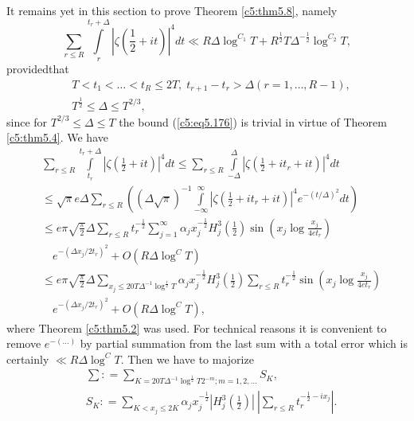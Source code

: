 It remains yet in this section to prove Theorem \ref{c5:thm5.8},
namely 
\begin{equation}
\sum\limits_{r \leq R} \int\limits^{t_r + \Delta}_{r} |\zeta
\left(\frac{1}{2} + it \right)|^4 dt \ll R\Delta \log^{C_1} T +
R^{\frac{1}{2}} T \Delta^{-\frac{1}{2}} \log^{C_2} T, 
\label{c5:eq5.176}
\end{equation}
provided\pageoriginale that
\begin{align*}
& T < t_1 < \ldots < t_R \leq 2 T, \; t_{r+1} - t_r > \Delta
(r=1,\ldots, R -1),\\ 
& T^{\frac{1}{2}} \leq \Delta \leq T^{2/3}, 
\end{align*}
since for $T^{2/3} \leq \Delta \leq T$ the bound (\ref{c5:eq5.176}) is
trivial in virtue of Theorem \ref{c5:thm5.4}. We have  
\begin{align*} 
&\sum\limits_{r \leq R} \int\limits^{t_r+\Delta}_{t_r} \left|\zeta
\left(\frac{1}{2} + it \right)\right|^4 dt \leq \sum\limits_{r \leq R}
\int\limits^{\Delta}_{-\Delta} \left|\zeta \left(\frac{1}{2} + it_r +
it \right)\right|^4 dt\\ 
&\leq \sqrt{\pi} e \Delta \sum\limits_{r \leq R} \left((\Delta
\sqrt{\pi})^{-1} \int\limits^{\infty}_{-\infty}  \left|\zeta
\left(\frac{1}{2} + it_r + it \right)\right|^4 e^{-(t/\Delta)^2} dt
\right)\\ 
&\leq e \pi \sqrt{\frac{\pi}{2}} \Delta \sum\limits_{r \leq R}
t^{-\frac{1}{2}}_r \sum\limits^\infty_{j=1} \alpha_j
x^{-\frac{1}{2}}_j H^3_j \left(\frac{1}{2} \right)  \sin \left(x_j
\log \frac{x_j}{4 et_r} \right)\\
&\quad e^{-(\Delta x_j/ 2t_r)^2} + O (R \Delta \log^C T)\\ 
&\leq e\pi \sqrt{\frac{\pi}{2}} \Delta \sum\limits_{x_j \leq 20 T
  \Delta^{-1} \log^{\frac{1}{2}} T} \alpha_j x^{-\frac{1}{2}}_j H^3_j
\left(\frac{1}{2} \right) \sum\limits_{r \leq R} t^{-\frac{1}{2}}_r
\sin \left(x_j \log \frac{x_j}{4 et_r} \right)\\  
&\quad e^{-(\Delta x_j/2 t_r)^2} + O (R \Delta \log^C T), 
\end{align*}
where Theorem \ref{c5:thm5.2} was used. For technical reasons it is
convenient to remove $e^{-(\ldots)}$ by partial summation from the
last sum with a total error which is certainly $\ll R \Delta \log^C
T$. Then we have to majorize  
\begin{align*}
& \sum:  = \sum\limits_{K = 20 T \Delta^{-1} \log^{\frac{1}{2}} T
    2^{-m}; m = 1,2, \ldots } S_K,\\ 
& S_K : = \sum\limits_{K < x_j \leq 2 K} \alpha_j x_j^{-\frac{1}{2}}
  \left|H^3_j \left(\frac{1}{2} \right)\right|~ \left| \sum\limits_{r \leq R}
  t^{-\frac{1}{2} - i x_j}_r\right|. 
\end{align*}

